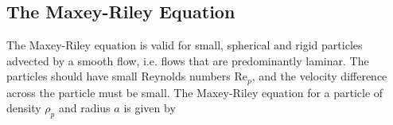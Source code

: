 


\subsection{The Maxey-Riley Equation}






The Maxey-Riley equation is valid for small, spherical and rigid particles advected by a smooth flow, i.e. flows that are predominantly laminar. The particles should have small Reynolds numbers Re$_p$, and the velocity difference across 
the particle must be small. The Maxey-Riley equation for a particle of density $\rho_p$ and radius $a$ is given by

